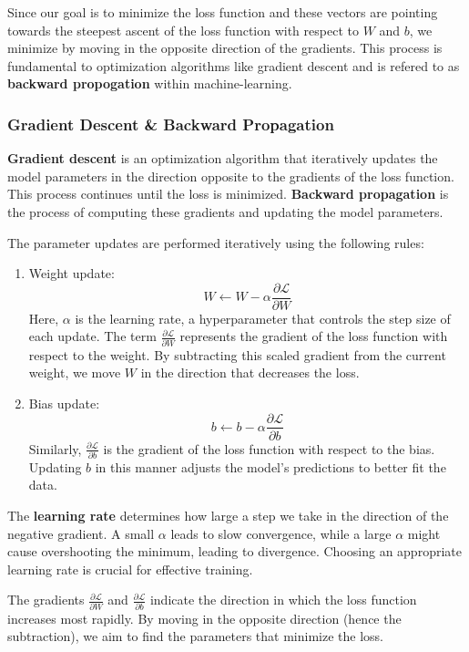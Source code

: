 Since our goal is to minimize the loss function and these vectors are pointing towards the steepest ascent of the loss function with respect to $W$ and $b$, we minimize by moving in the opposite direction of the gradients. This process is fundamental to optimization algorithms like gradient descent and is refered to as \textbf{backward propogation} within machine-learning.

\subsubsection{Gradient Descent \& Backward Propagation}
\label{subsubsec:2}
\textbf{Gradient descent} is an optimization algorithm that iteratively updates the model parameters in the direction opposite to the gradients of the loss function. This process continues until the loss is minimized. \textbf{Backward propagation} is the process of computing these gradients and updating the model parameters.

The parameter updates are performed iteratively using the following rules:
\begin{enumerate}
    \item  Weight update:
    $$W \leftarrow W - \alpha \frac{\partial \mathcal{L}}{\partial W}$$
   Here, $\alpha$ is the learning rate, a hyperparameter that controls the step size of each update. The term $\frac{\partial \mathcal{L}}{\partial W}$ represents the gradient of the loss function with respect to the weight. By subtracting this scaled gradient from the current weight, we move $ W $ in the direction that decreases the loss.

    \item Bias update:
    $$b \leftarrow b - \alpha \frac{\partial \mathcal{L}}{\partial b}$$
    Similarly, $\frac{\partial \mathcal{L}}{\partial b}$ is the gradient of the loss function with respect to the bias. Updating $b$ in this manner adjusts the model's predictions to better fit the data.
\end{enumerate}

The \textbf{learning rate} determines how large a step we take in the direction of the negative gradient. A small $\alpha$ leads to slow convergence, while a large $\alpha$ might cause overshooting the minimum, leading to divergence. Choosing an appropriate learning rate is crucial for effective training.

The gradients $\frac{\partial \mathcal{L}}{\partial W}$ and $\frac{\partial \mathcal{L}}{\partial b}$ indicate the direction in which the loss function increases most rapidly. By moving in the opposite direction (hence the subtraction), we aim to find the parameters that minimize the loss.

